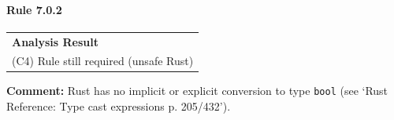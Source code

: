 \paragraph{Rule 7.0.2}
\begin{longtable}{p{13cm}}
\textbf{Analysis Result} \\
(C4) Rule still required (unsafe Rust) \\
\end{longtable}
\textbf{Comment:} Rust has no implicit or explicit conversion to type \texttt{bool} (see `Rust Reference: Type cast expressions p. 205/432'). \\
